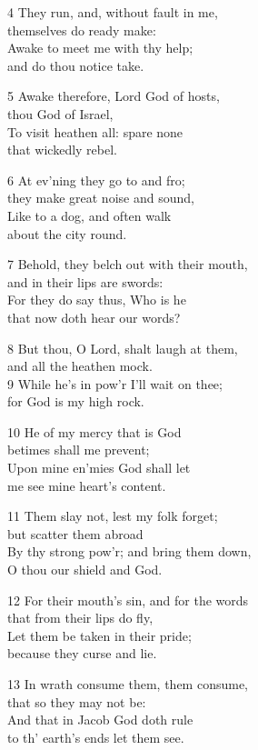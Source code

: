 \begin{multicols}{3}
4 They run, and, without fault in me,\\
themselves do ready make:\\
Awake to meet me with thy help;\\
and do thou notice take.

5 Awake therefore, Lord God of hosts,\\
thou God of Israel,\\
To visit heathen all: spare none\\
that wickedly rebel.

6 At ev’ning they go to and fro;\\
they make great noise and sound,\\
Like to a dog, and often walk\\
about the city round.

7 Behold, they belch out with their mouth,\\
and in their lips are swords:\\
For they do say thus, Who is he\\
that now doth hear our words?

8 But thou, O Lord, shalt laugh at them,\\
and all the heathen mock.\\
9 While he’s in pow’r I’ll wait on thee;\\
for God is my high rock.

10 He of my mercy that is God\\
betimes shall me prevent;\\
Upon mine en’mies God shall let\\
me see mine heart’s content.

11 Them slay not, lest my folk forget;\\
but scatter them abroad\\
By thy strong pow’r; and bring them down,\\
O thou our shield and God.

12 For their mouth’s sin, and for the words\\
that from their lips do fly,\\
Let them be taken in their pride;\\
because they curse and lie.

13 In wrath consume them, them consume,\\
that so they may not be:\\
And that in Jacob God doth rule\\
to th’ earth’s ends let them see.


\end{multicols}
